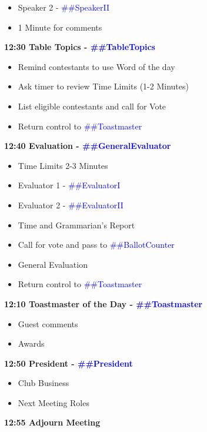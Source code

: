 \documentclass{article}
\newcommand{\toastmaster}{##Toastmaster}
\newcommand{\president}{##President}
\newcommand{\tableTopics}{##TableTopics}
\newcommand{\generalEvaluator}{##GeneralEvaluator}
\newcommand{\evaluatorI}{##EvaluatorI}
\newcommand{\evaluatorII}{##EvaluatorII}
\newcommand{\speakerII}{##SpeakerII}
\newcommand{\ballotCounter}{##BallotCounter}
\newcommand{\speechIITitle}{##SpeechIITitle}
\newcommand{\speechIIProject}{##SpeechIIProject}
\newcommand{\speechIITimeConstraints}{##SpeechIITimeConstraints}
\begin{document}
\begin{spacing}{.8}
\begin{itemize}
    \item Speaker 2 - \textcolor{blue}{\speakerII{}}
    \item 1 Minute for comments
  \end{itemize}
  {\Large \bf12:30 Table Topics - \textcolor{blue}{\tableTopics{}}} 
  \begin{itemize}
    \item Remind contestants to use Word of the day
    \item Ask timer to review Time Limits  (1-2 Minutes)
    \item List eligible contestants and call for Vote
    \item Return control to \textcolor{blue}{\toastmaster{}}
  \end{itemize}
  {\Large \bf12:40 Evaluation - \textcolor{blue}{\generalEvaluator{}}} 
  \begin{itemize}
    \item Time Limits 2-3 Minutes
    \item Evaluator 1 - \textcolor{blue}{\evaluatorI{}}
    \item Evaluator 2 - \textcolor{blue}{\evaluatorII{}}
	\item Time and Grammarian's Report
    \item Call for vote and pass to \textcolor{blue}{\ballotCounter{}}
	\item General Evaluation
    \item Return control to \textcolor{blue}{\toastmaster{}}
  \end{itemize}
  {\Large \bf12:10 Toastmaster of the Day - \textcolor{blue}{\toastmaster{}}} 
  \begin{itemize}
    \item Guest comments
    \item Awards
  \end{itemize}
  {\Large \bf12:50 President - \textcolor{blue}{\president{}}} 
  \begin{itemize}
    \item Club Business
    \item Next Meeting Roles
  \end{itemize}
  {\Large \bf12:55 Adjourn Meeting} 
  \end{spacing}
  
\end{document}
